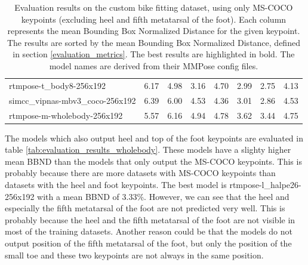 \begin{table}[htbp]
\begin{tabular}{l ccccccc}
        rtmpose-t\_body8-256x192         & 6.17           & 4.98          & 3.16          & 4.70              & 2.99           & 2.75           & 4.13          \\
        simcc\_vipnas-mbv3\_coco-256x192 & 6.39           & 6.00          & 4.53          & 4.36              & 3.01           & 2.86           & 4.53          \\
        rtmpose-m-wholebody-256x192      & 5.57           & 6.16          & 4.94          & 4.78              & 3.62           & 3.44           & 4.75          \\
        \bottomrule
    \end{tabular}
    \caption{Evaluation results on the custom bike fitting dataset, using only MS-COCO keypoints (excluding heel and fifth metatarsal of the foot). Each column represents the mean Bounding Box Normalized Distance for the given keypoint. The results are sorted by the mean Bounding Box Normalized Distance, defined in section \ref{evaluation_metrics}. The best results are highlighted in bold. The model names are derived from their MMPose config files.}
    \label{tab:evaluation_results_all}

\end{table}

The models which also output heel and top of the foot keypoints are evaluated in table \ref{tab:evaluation_results_wholebody}. These models have a slighty higher mean BBND than the models that only output the MS-COCO keypoints. This is probably because there are more datasets with MS-COCO keypoints than datasets with the heel and foot keypoints. The best model is rtmpose-l\_halpe26-256x192 with a mean BBND of 3.33\%. However, we can see that the heel and especially the fifth metatarsal of the foot are not predicted very well. This is probably because the heel and the fifth metatarsal of the foot are not visible in most of the training datasets. Another reason could be that the models do not output position of the fifth metatarsal of the foot, but only the position of the small toe and these two keypoints are not always in the same position.

